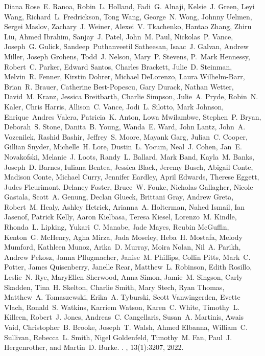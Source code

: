 \documentclass[12pt]{article}
\begin{document}
\begin{thebibliography}{10}
Diana Rose~E. Ranoa, Robin~L. Holland, Fadi~G. Alnaji, Kelsie~J. Green, Leyi
  Wang, Richard~L. Fredrickson, Tong Wang, George~N. Wong, Johnny Uelmen,
  Sergei Maslov, Zachary~J. Weiner, Alexei~V. Tkachenko, Hantao Zhang, Zhiru
  Liu, Ahmed Ibrahim, Sanjay~J. Patel, John~M. Paul, Nickolas~P. Vance,
  Joseph~G. Gulick, Sandeep~Puthanveetil Satheesan, Isaac~J. Galvan, Andrew
  Miller, Joseph Grohens, Todd~J. Nelson, Mary~P. Stevens, P.~Mark Hennessy,
  Robert~C. Parker, Edward Santos, Charles Brackett, Julie~D. Steinman,
  Melvin~R. Fenner, Kirstin Dohrer, Michael DeLorenzo, Laura Wilhelm-Barr,
  Brian~R. Brauer, Catherine Best-Popescu, Gary Durack, Nathan Wetter, David~M.
  Kranz, Jessica Breitbarth, Charlie Simpson, Julie~A. Pryde, Robin~N. Kaler,
  Chris Harris, Allison~C. Vance, Jodi~L. Silotto, Mark Johnson, Enrique~Andres
  Valera, Patricia~K. Anton, Lowa Mwilambwe, Stephen~P. Bryan, Deborah~S.
  Stone, Danita~B. Young, Wanda~E. Ward, John Lantz, John~A. Vozenilek, Rashid
  Bashir, Jeffrey~S. Moore, Mayank Garg, Julian~C. Cooper, Gillian Snyder,
  Michelle~H. Lore, Dustin~L. Yocum, Neal~J. Cohen, Jan~E. Novakofski,
  Melanie~J. Loots, Randy~L. Ballard, Mark Band, Kayla~M. Banks, Joseph~D.
  Barnes, Iuliana Bentea, Jessica Black, Jeremy Busch, Abigail Conte, Madison
  Conte, Michael Curry, Jennifer Eardley, April Edwards, Therese Eggett, Judes
  Fleurimont, Delaney Foster, Bruce~W. Fouke, Nicholas Gallagher, Nicole
  Gastala, Scott~A. Genung, Declan Glueck, Brittani Gray, Andrew Greta,
  Robert~M. Healy, Ashley Hetrick, Arianna~A. Holterman, Nahed Ismail, Ian
  Jasenof, Patrick Kelly, Aaron Kielbasa, Teresa Kiesel, Lorenzo~M. Kindle,
  Rhonda~L. Lipking, Yukari~C. Manabe, Jade Mayes, Reubin McGuffin, Kenton~G.
  McHenry, Agha Mirza, Jada Moseley, Heba~H. Mostafa, Melody Mumford, Kathleen
  Munoz, Arika~D. Murray, Moira Nolan, Nil~A. Parikh, Andrew Pekosz, Janna
  Pflugmacher, Janise~M. Phillips, Collin Pitts, Mark~C. Potter, James
  Quisenberry, Janelle Rear, Matthew~L. Robinson, Edith Rosillo, Leslie~N. Rye,
  MaryEllen Sherwood, Anna Simon, Jamie~M. Singson, Carly Skadden, Tina~H.
  Skelton, Charlie Smith, Mary Stech, Ryan Thomas, Matthew~A. Tomaszewski,
  Erika~A. Tyburski, Scott Vanwingerden, Evette Vlach, Ronald~S. Watkins,
  Karriem Watson, Karen~C. White, Timothy~L. Killeen, Robert~J. Jones,
  Andreas~C. Cangellaris, Susan~A. Martinis, Awais Vaid, Christopher~B. Brooke,
  Joseph~T. Walsh, Ahmed Elbanna, William~C. Sullivan, Rebecca~L. Smith, Nigel
  Goldenfeld, Timothy~M. Fan, Paul~J. Hergenrother, and Martin~D. Burke.
.
, 13(1):3207, 2022.


\end{thebibliography}
\end{document}
